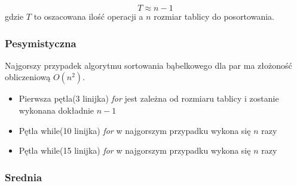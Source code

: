 \begin{equation*}
T \approx n -1
\end{equation*}
gdzie $T$ to oszacowana ilość operacji a $n$ rozmiar tablicy do posortowania.\\
\subsubsection*{Pesymistyczna}
Najgorszy przypadek algorytmu sortowania bąbelkowego dla par ma złożoność obliczeniową $O(n^2)$.
\begin{itemize}
\item Pierwsza pętla(3 linijka) \textit{for} jest zależna od rozmiaru tablicy i zostanie wykonana dokładnie $n-1$
\item Pętla while(10 linijka) \textit{for} w najgorszym przypadku wykona się $n$ razy
\item Pętla while(15 linijka) \textit{for} w najgorszym przypadku wykona się $n$ razy

\end{itemize}

\subsubsection*{Srednia}

